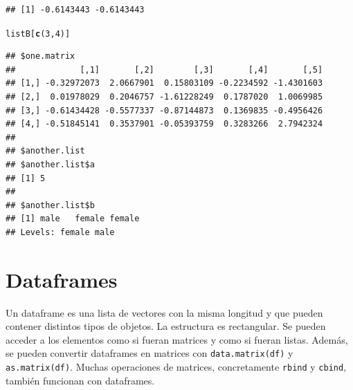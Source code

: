 \documentclass{config/apuntes}\usepackage[]{graphicx}\usepackage[]{xcolor}
\makeatletter
\newcommand{\hlnum}[1]{\textcolor[rgb]{0.686,0.059,0.569}{#1}}%
\newcommand{\hldef}[1]{\textcolor[rgb]{0.345,0.345,0.345}{#1}}%
\newcommand{\hlkwd}[1]{\textcolor[rgb]{0.737,0.353,0.396}{\textbf{#1}}}%
\newenvironment{kframe}{%
 \def\at@end@of@kframe{}%
 \ifinner\ifhmode%
  \def\at@end@of@kframe{\end{minipage}}%
  \begin{minipage}{\columnwidth}%
 \fi\fi%
 \def\FrameCommand##1{\hskip\@totalleftmargin \hskip-\fboxsep
 \colorbox{shadecolor}{##1}\hskip-\fboxsep
     \hskip-\linewidth \hskip-\@totalleftmargin \hskip\columnwidth}%
 \MakeFramed {\advance\hsize-\width
   \@totalleftmargin\z@ \linewidth\hsize
   \@setminipage}}%
 {\par\unskip\endMakeFramed%
 \at@end@of@kframe}
\newenvironment{knitrout}{}{} %
\newcommand{\code}[1]{\texttt{#1}}
\makeatother
\begin{document}
\begin{knitrout}
\begin{kframe}
\begin{alltt}
\end{alltt}
\begin{verbatim}
## [1] -0.6143443 -0.6143443
\end{verbatim}
\begin{alltt}
\hldef{listB[}\hlkwd{c}\hldef{(}\hlnum{3}\hldef{,} \hlnum{4}\hldef{)]}
\end{alltt}
\begin{verbatim}
## $one.matrix
##             [,1]       [,2]        [,3]       [,4]       [,5]
## [1,] -0.32972073  2.0667901  0.15803109 -0.2234592 -1.4301603
## [2,]  0.01978029  0.2046757 -1.61228249  0.1787020  1.0069985
## [3,] -0.61434428 -0.5577337 -0.87144873  0.1369835 -0.4956426
## [4,] -0.51845141  0.3537901 -0.05393759  0.3283266  2.7942324
## 
## $another.list
## $another.list$a
## [1] 5
## 
## $another.list$b
## [1] male   female female
## Levels: female male
\end{verbatim}
\end{kframe}
\end{knitrout}

\section{Dataframes}
Un dataframe es una lista de vectores con la misma longitud y que pueden contener distintos tipos de objetos. La estructura es rectangular. Se pueden acceder a los elementos como si fueran matrices y como si fueran listas. Además, se pueden convertir dataframes en matrices con \code{data.matrix(df)} y \code{as.matrix(df)}. Muchas operaciones de matrices, concretamente \code{rbind} y \code{cbind}, también funcionan con dataframes.
\end{document}
